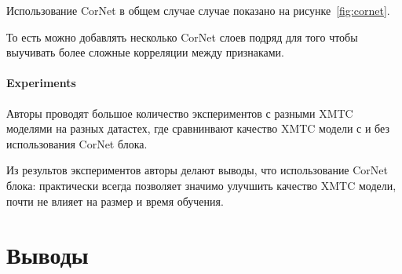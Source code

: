 Использование CorNet в общем случае случае показано на рисунке~\ref{fig:cornet}.

То есть можно добавлять несколько CorNet слоев подряд для того чтобы выучивать более сложные корреляции между признаками. \\

\paragraph{Experiments}

Авторы проводят большое количество экспериментов с разными XMTC моделями на разных датастех, где сравнинвают качество XMTC модели с и без использования CorNet блока.

Из результов экспериментов авторы делают выводы, что использование CorNet блока: практически всегда позволяет значимо улучшить качество XMTC модели, почти не влияет на размер и время обучения.

\section*{Выводы}


